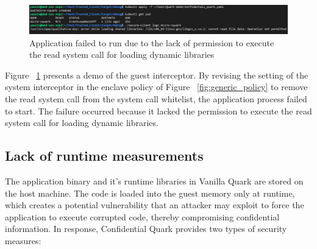 \begin{figure}[H]
    \centering
    \includegraphics[width=1\textwidth]{images/application_failed_to_start_due_to_syscall_interceptor.png}
    \caption[Application failed to run due to the lack of permission to execute the read system call for loading dynamic libraries]{Application failed to run due to the lack of permission to execute the read system call for loading dynamic libraries}
    \label{fig:application_failed_to_start_due_to_syscall_interceptor}
\end{figure}


Figure ~\ref{fig:application_failed_to_start_due_to_syscall_interceptor} presents a demo of the guest interceptor. By revising the setting of the system interceptor in the enclave policy of Figure ~\ref{fig:generic_policy} to remove the read system call from the system call whitelist, 
the application process failed to start. The failure occurred because it lacked the permission to execute the read system call for loading dynamic libraries.
\subsection{Lack of runtime measurements}

The application binary and it’s runtime libraries in Vanilla Quark are stored on the host machine. The code is loaded into the guest memory only at runtime, which creates a potential vulnerability that an attacker may exploit to force the 
application to execute corrupted code, thereby compromising confidential information. In response, Confidential Quark provides two types of security measures:

